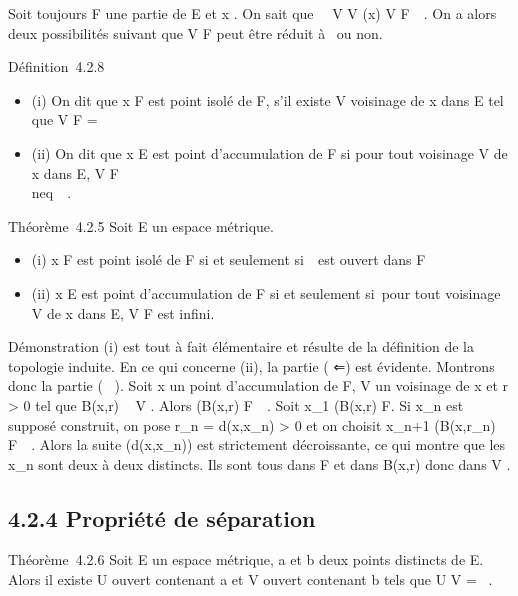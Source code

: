 \documentclass[]{article}
\begin{document}
Soit toujours F une partie de E et x \in\overlineF. On
sait que \forall~~V \in V (x) V \bigcap
F\neq~\varnothing~. On a alors deux possibilités suivant que
V \bigcap F peut être réduit à \x\ ou non.

Définition~4.2.8

\begin{itemize}
\itemsep1pt\parskip0pt
\item
  (i) On dit que x \in F est point isolé de F, s'il existe V voisinage de
  x dans E tel que V \bigcap F = \x\
\item
  (ii) On dit que x \in E est point d'accumulation de F si pour tout
  voisinage V de x dans E, V \bigcap F
  \diagdown\x\\neq~\varnothing~.
\end{itemize}

Théorème~4.2.5 Soit E un espace métrique.

\begin{itemize}
\itemsep1pt\parskip0pt
\item
  (i) x \in F est point isolé de F si et seulement
  si~\x\ est ouvert dans F
\item
  (ii) x \in E est point d'accumulation de F si et seulement si~pour tout
  voisinage V de x dans E, V \bigcap F est infini.
\end{itemize}

Démonstration (i) est tout à fait élémentaire et résulte de la
définition de la topologie induite. En ce qui concerne (ii), la partie (
⇐) est évidente. Montrons donc la partie ( \rigtharrow~). Soit x un point
d'accumulation de F, V un voisinage de x et r > 0 tel que
B(x,r) \subset~ V . Alors (B(x,r) \diagdown\x\) \bigcap
F\neq~\varnothing~. Soit x_1 \in (B(x,r)
\diagdown\x\) \bigcap F. Si x_n est supposé
construit, on pose r_n = d(x,x_n) > 0 et
on choisit x_n+1 \in (B(x,r_n)
\diagdown\x\) \bigcap
F\neq~\varnothing~. Alors la suite (d(x,x_n)) est
strictement décroissante, ce qui montre que les x_n sont deux à
deux distincts. Ils sont tous dans F et dans B(x,r) donc dans V .

\subsection{4.2.4 Propriété de séparation}

Théorème~4.2.6 Soit E un espace métrique, a et b deux points distincts
de E. Alors il existe U ouvert contenant a et V ouvert contenant b tels
que U \bigcap V = \varnothing~.
\end{document}
